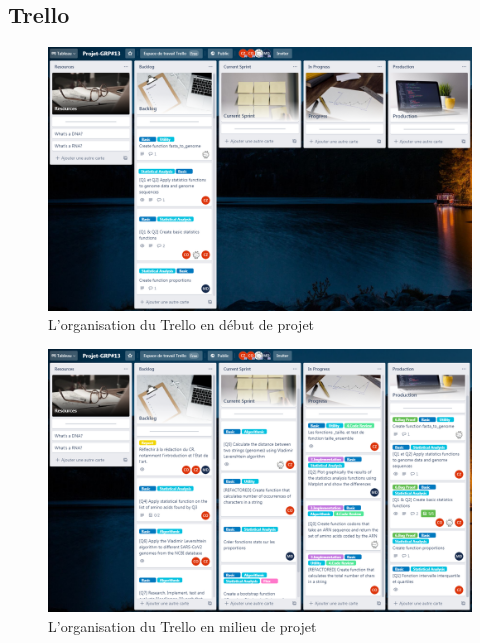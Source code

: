 \documentclass[12pt]{article}
\begin{document}
    \subsection*{Trello}
        \begin{figure}[!h]
            \centering
            \includegraphics[scale = 0.44]{Images/Gestion de Projet/Trello/trello_debut.PNG}
            \caption{L'organisation du Trello en début de projet}
            \label{fig:Trellodebut}
        \end{figure}
        \begin{figure}[!h]
            \centering
            \includegraphics[scale = 0.44]{Images/Gestion de Projet/Trello/trello_milieu.PNG}
            \caption{L'organisation du Trello en milieu de projet}
        \label{fig:Trellomilieu}
        \end{figure}
        \newpage
\end{document}
